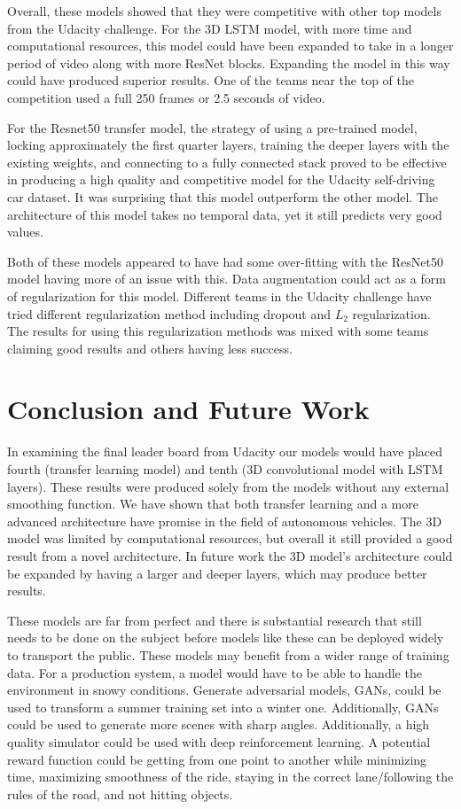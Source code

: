 \documentclass[10pt,twocolumn,letterpaper]{article}
\begin{document}
Overall, these models showed that they were competitive with other top models from the Udacity challenge. For the 3D LSTM model, with more time and computational resources, this model could have been expanded to take in a longer period of video along with more ResNet blocks. Expanding the model in this way could have produced superior results. One of the teams near the top of the competition used a full 250 frames or 2.5 seconds of video.

For the Resnet50 transfer model, the strategy of using a pre-trained model, locking approximately the first quarter layers, training the deeper layers with the existing weights, and connecting to a fully connected stack proved to be effective in producing a high quality and competitive model for the Udacity self-driving car dataset. It was surprising that this model outperform the other model. The architecture of this model takes no temporal data, yet it still predicts very good values.

Both of these models appeared to have had some over-fitting with the ResNet50 model having more of an issue with this. Data augmentation could act as a form of regularization for this model. Different teams in the Udacity challenge have tried different regularization method including dropout and $L_{2}$ regularization. The results for using this regularization methods was mixed with some teams claiming good results and others having less success. 


\section{Conclusion and Future Work}

In examining the final leader board from Udacity our models would have placed fourth (transfer learning model) and tenth (3D convolutional model with LSTM layers). These results were produced solely from the models without any external smoothing function. We have shown that both transfer learning and a more advanced architecture have promise in the field of autonomous vehicles. The 3D model was limited by computational resources, but overall it still provided a good result from a novel architecture. In future work the 3D model's architecture could be expanded by having a larger and deeper layers, which may produce better results.

These models are far from perfect and there is substantial research that still needs to be done on the subject before models like these can be deployed widely to transport the public. These models may benefit from a wider range of training data. For a production system, a model would have to be able to handle the environment in snowy conditions. Generate adversarial models, GANs, could be used to transform a summer training set into a winter one. Additionally, GANs could be used to generate more scenes with sharp angles. Additionally, a high quality simulator could be used with deep reinforcement learning. A potential reward function could be getting from one point to another while minimizing time, maximizing smoothness of the ride, staying in the correct lane/following the rules of the road, and not hitting objects.




{\small


}
\end{document}
